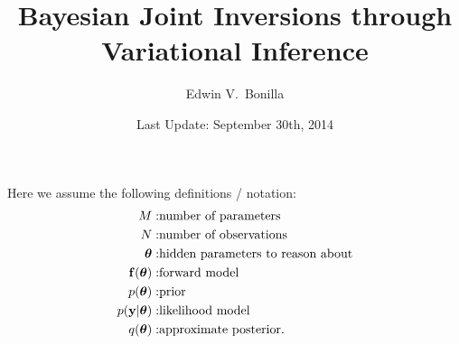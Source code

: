 \documentclass[11pt,a4paper]{article}
\title{Bayesian Joint Inversions through Variational Inference}
\author{Edwin V.~Bonilla}
\date{Last Update: September 30th, 2014}
\begin{document}
\maketitle

Here we assume the following definitions / notation:
\begin{align}
	M: & \text{number of parameters} \\
	N: & \text{number of observations} \\
	\boldsymbol{ \theta }: & \text{hidden parameters to reason about} \\ 
	\mathbf{f}(\boldsymbol{ \theta }): & \text{forward model} \\ 
	p(\boldsymbol{ \theta }): & \text{prior} \\
	p(\mathbf{y}|\boldsymbol{ \theta }): & \text{likelihood model} \\ 
	q(\boldsymbol{ \theta }): & \text{approximate posterior} \text{.}
\end{align}



\pagebreak





\end{document}
